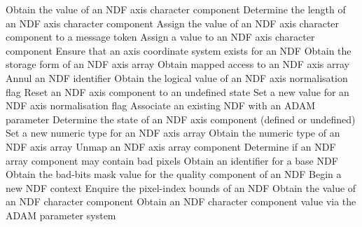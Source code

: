 {\small
\begin{description}{\addtolength{\itemindent}{-8mm}}
            {Obtain the value of an NDF axis character component}
            {Determine the length of an NDF axis character component}
            {Assign the value of an NDF axis character component to a message token}
            {Assign a value to an NDF axis character component}
            {Ensure that an axis coordinate system exists for an NDF}
            {Obtain the storage form of an NDF axis array}
            {Obtain mapped access to an NDF axis array}
            {Annul an NDF identifier}
            {Obtain the logical value of an NDF axis normalisation flag}
            {Reset an NDF axis component to an undefined state}
            {Set a new value for an NDF axis normalisation flag}
            {Associate an existing NDF with an ADAM parameter}
            {Determine the state of an NDF axis component (defined or undefined)}
            {Set a new numeric type for an NDF axis array}
            {Obtain the numeric type of an NDF axis array}
            {Unmap an NDF axis array component}
            {Determine if an NDF array component may contain bad pixels}
            {Obtain an identifier for a base NDF}
            {Obtain the bad-bits mask value for the quality component of an NDF}
            {Begin a new NDF context}
            {Enquire the pixel-index bounds of an NDF}
            {Obtain the value of an NDF character component}
            {Obtain an NDF character component value via the ADAM parameter system}

\end{description}}
